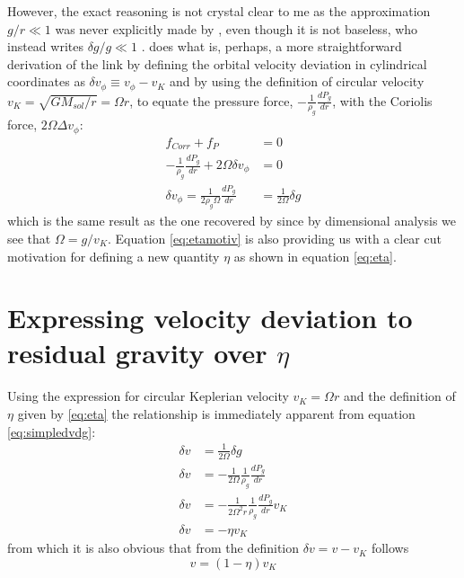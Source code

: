\documentclass[12pt]{article}
\begin{document}
However, the exact reasoning is not crystal clear to me as the approximation $g/r \ll 1$ was never explicitly made by \citet{Weidenschilling77}, even though it is not baseless, who instead writes $\delta g/g \ll 1$ . \citet{LesHouches} does what is, perhaps, a more straightforward derivation of the link by defining the orbital velocity deviation in cylindrical coordinates as $\delta v_\phi \equiv v_\phi - v_K$ and by using the definition of circular velocity $v_K = \sqrt{GM_{sol}/r} = \Omega r$, to equate the pressure force, $-\frac{1}{\rho_g}\frac{dP_g}{dr}$, with the Coriolis force, $2\Omega\Delta v_\phi$:
\begin{align}
    \label{eq:simpledvdg}
    f_{Corr} + f_P &= 0 \\
    -\frac{1}{\rho_g}\frac{dP_g}{dr} + 2\Omega\delta v_\phi &= 0 \\
    \label{eq:etamotiv}
    \delta v_\phi = \frac{1}{2\rho_g\Omega}\frac{dP_g}{dr} &= \frac{1}{2\Omega}\delta g
\end{align}
which is the same result as the one recovered by \citet{Weidenschilling77} since by dimensional analysis we see that $\Omega = g/v_K$. Equation \ref{eq:etamotiv} is also providing us with a clear cut motivation for defining a new quantity $\eta$ as shown in equation \ref{eq:eta}.

\newpage
\section{Expressing velocity deviation to residual gravity over $\eta$}
\label{appendix:B}

Using the expression for circular Keplerian velocity $v_K = \Omega r$ and the definition of $\eta$ given by \ref{eq:eta} the relationship is immediately apparent from equation \ref{eq:simpledvdg}:
\begin{align}
    \delta v &= \frac{1}{2\Omega}\delta g \\
    \delta v &= -\frac{1}{2\Omega}\frac{1}{\rho_g}\frac{dP_g}{dr} \\
    \delta v &= -\frac{1}{2\Omega^2r}\frac{1}{\rho_g}\frac{dP_g}{dr} v_K \\
    \delta v &= - \eta v_K
\end{align}
from which it is also obvious that from the definition $\delta v = v-v_K$ follows
\begin{equation}
    v = (1-\eta)v_K
\end{equation}
\end{document}
